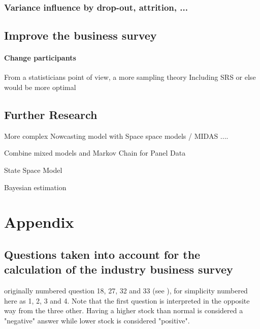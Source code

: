 \documentclass[12pt,a4paper,oneside]{book}
\begin{document}
\subsection*{Variance influence by drop-out, attrition, ...}

\section*{Improve the business survey}

\subsubsection*{Change participants}

From a statisticians point of view, a more sampling theory Including SRS or else would be more optimal


\section*{Further Research}



More complex Nowcasting model with Space space models / MIDAS ....

Combine mixed models and Markov Chain for Panel Data \citep{de_haan-rietdijk_use_2017} 

State Space Model

Bayesian estimation \cite{bialowolski_bayesian_nodate}

\nocite{hlavac_stargazer:_2018}


 


  
\begin{appendix}
  \listoffigures
  \listoftables
\end{appendix}


\chapter*{Appendix}

\section*{Questions taken into account for the calculation of the industry business survey}
\label{Appendix: Question NS975 description}

originally numbered question 18, 27, 32 and 33 (see ), for simplicity numbered here as 1, 2, 3 and 4.
Note that the first question is interpreted in the opposite way from the three other. Having a higher stock than normal is considered a "negative" answer while lower stock is considered "positive".
\end{document}
